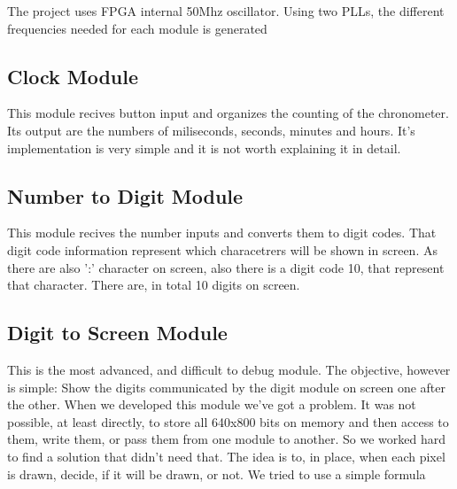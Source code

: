The project uses FPGA internal 50Mhz oscillator. Using two PLLs, the different frequencies needed for each module is generated

\subsection*{Clock Module}

This module recives button input and organizes the counting of the chronometer.
Its output are the numbers of miliseconds, seconds, minutes and hours.
It's implementation is very simple and it is not worth explaining it in detail.

\subsection*{Number to Digit Module}

This module recives the number inputs and converts them to digit codes. That digit code information represent which characetrers will be shown in screen. As there are also ':' character on screen, also there is a digit code 10, that represent that character.
There are, in total 10 digits on screen.

\subsection*{Digit to Screen Module}
This is the most advanced, and difficult to debug module. The objective, however is simple: Show the digits communicated by the digit module on screen one after the other.
When we developed this module we've got a problem. It was not possible, at least directly, to store all 640x800 bits on memory and then access to them, write them, or pass them from one module to another. So we worked hard to find a solution that didn't need that.
The idea is to, in place, when each pixel is drawn, decide, if it will be drawn, or not. We tried to use a simple formula 

